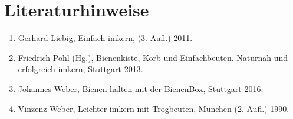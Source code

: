 \documentclass[12pt,a4paper,ngerman]{scrartcl}
\begin{document}
\section{Literaturhinweise}

\begin{enumerate}
\item Gerhard Liebig, Einfach imkern, (3. Aufl.) 2011.
\item Friedrich Pohl (Hg.), Bienenkiste, Korb und Einfachbeuten. Naturnah und erfolgreich imkern, Stuttgart 2013.
\item Johannes Weber, Bienen halten mit der BienenBox, Stuttgart 2016.
\item Vinzenz Weber, Leichter imkern mit Trogbeuten, München (2. Aufl.) 1990.
\end{enumerate}
\end{document}
